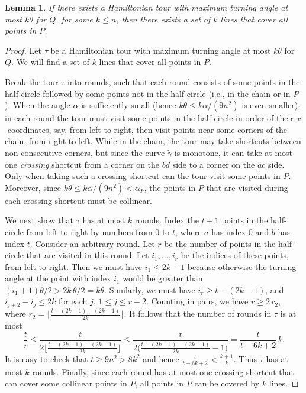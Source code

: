 \documentclass[letterpaper,11pt]{article}
\newtheorem{lemma}{Lemma}
\def\ie{{i.e.}}
\begin{document}
\begin{lemma}\label{lem:hamiltonian-reverse}
If there exists a Hamiltonian tour with maximum turning angle at most
$k\theta$ for $Q$, for some $k \leq n$,
then there exists a set of $k$ lines that cover all points in $P$.
\end{lemma}
\begin{proof}
Let $\tau$ be a Hamiltonian tour with maximum turning angle at most
$k\theta$ for $Q$.
We will find a set of $k$ lines that cover all points in $P$.

Break the tour $\tau$ into rounds,
such that each round consists of
some points in the half-circle followed by
some points not in the half-circle (\ie, in the chain or in $P$).
When the angle $\alpha$ is sufficiently small
(hence $k\theta \le k\alpha/(9n^2)$ is even smaller),
in each round the tour
must visit some points in the half-circle in order of their $x$-coordinates,
say, from left to right,
then visit points near some corners of the chain, from right to left.
While in the chain,
the tour may take shortcuts between non-consecutive corners,
but since the curve $\tilde\gamma$ is monotone,
it can take at most one \emph{crossing} shortcut from a corner on the $bd$ side
to a corner on the $ac$ side.
Only when taking such a crossing shortcut can the tour visit some points in $P$.
Moreover,
since $k\theta \le k\alpha/(9n^2) < \alpha_P$,
the points in $P$ that are visited during each crossing shortcut
must be collinear.

We next show that $\tau$ has at most $k$ rounds.
Index the $t+1$ points in the half-circle from left to right
by numbers from $0$ to $t$,
where $a$ has index $0$ and $b$ has index $t$.
Consider an arbitrary round.
Let $r$ be the number of points in the half-circle
that are visited in this round.
Let $i_1,\ldots,i_r$ be the indices of these points, from left to right.
Then we must have $i_1 \le 2k-1$ because otherwise
the turning angle at the point with index $i_1$ would be greater than
$(i_1 + 1)\theta/2 > 2k\,\theta/2 = k\theta$.
Similarly, we must have $i_r \ge t - (2k-1)$,
and $i_{j+2} - i_j \le 2k$ for each $j$, $1 \le j \le r-2$.
Counting in pairs, we have $r \ge 2\, r_2$,
where $r_2 = \bigl\lfloor \frac{t - (2k-1) - (2k-1)}{2k} \bigr\rfloor$.
It follows that the number of rounds in $\tau$ is at most
$$
\frac{t}{r}
\le \frac{t}{2 \bigl\lfloor \frac{t - (2k-1) - (2k-1)}{2k} \bigr\rfloor}
\le \frac{t}{2 \bigl( \frac{t - (2k-1) - (2k-1)}{2k} - 1 \bigr)}
= \frac{t}{t - 6k + 2}\,k.
$$
It is easy to check that $t \ge 9n^2 > 8k^2$
and hence $\frac{t}{t - 6k + 2} < \frac{k+1}k$.
Thus $\tau$ has at most $k$ rounds.
Finally,
since each round has at most one crossing shortcut
that can cover some collinear points in $P$,
all points in $P$ can be covered by $k$ lines.
\end{proof}
\end{document}
